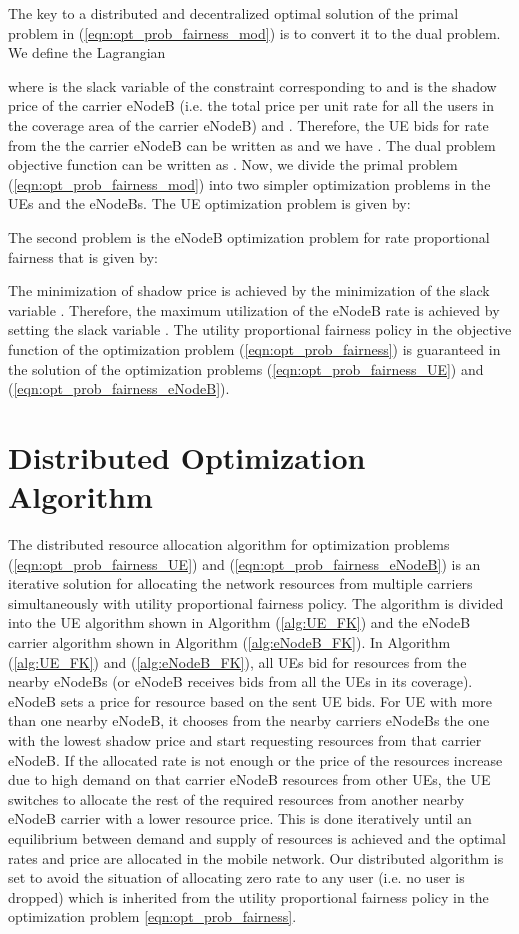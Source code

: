 \documentclass[conference]{IEEEtran}
\begin{document}
The key to a distributed and decentralized optimal solution of the primal problem in (\ref{eqn:opt_prob_fairness_mod}) is to convert it to the dual problem. We define the Lagrangian

where  is the  slack variable of the  constraint corresponding to  and  is the shadow price of the  carrier eNodeB (i.e. the total price per unit rate for all the users in the coverage area of the  carrier eNodeB) and . Therefore, the  UE bids for rate from the the  carrier eNodeB can be written as  and we have . The dual problem objective function can be written as . Now, we divide the primal problem (\ref{eqn:opt_prob_fairness_mod}) into two simpler optimization problems in the UEs and the eNodeBs. The  UE optimization problem is given by: 


The second problem is the  eNodeB optimization problem for rate proportional fairness that is given by: 

The minimization of shadow price  is achieved by the minimization of the slack variable . Therefore, the maximum utilization of the  eNodeB rate  is achieved by setting the slack variable . The utility proportional fairness policy in the objective function of the optimization problem (\ref{eqn:opt_prob_fairness}) is guaranteed in the solution of the optimization problems (\ref{eqn:opt_prob_fairness_UE}) and (\ref{eqn:opt_prob_fairness_eNodeB}).

\section{Distributed Optimization Algorithm}\label{sec:Algorithm}

The distributed resource allocation algorithm for optimization problems (\ref{eqn:opt_prob_fairness_UE}) and (\ref{eqn:opt_prob_fairness_eNodeB}) is an iterative solution for allocating the network resources from multiple carriers simultaneously with utility proportional fairness policy. The algorithm is divided into the  UE algorithm shown in Algorithm (\ref{alg:UE_FK}) and the  eNodeB carrier algorithm shown in Algorithm (\ref{alg:eNodeB_FK}). In Algorithm (\ref{alg:UE_FK}) and (\ref{alg:eNodeB_FK}), all UEs bid for resources from the nearby eNodeBs (or eNodeB receives bids from all the UEs in its coverage). eNodeB sets a price for resource based on the sent UE bids. For UE with more than one nearby eNodeB, it chooses from the nearby carriers eNodeBs the one with the lowest shadow price and start requesting resources from that carrier eNodeB. If the allocated rate is not enough or the price of the resources increase due to high demand on that carrier eNodeB resources from other UEs, the UE 
switches to allocate the rest of the required resources from another nearby eNodeB carrier with a lower resource price. This is done iteratively until an equilibrium between demand and supply of resources is achieved and the optimal rates and price are allocated in the mobile network. Our distributed algorithm is set to avoid the situation of allocating zero rate to any user (i.e. no user is dropped) which is inherited from the utility proportional fairness policy in the optimization problem \ref{eqn:opt_prob_fairness}. 
\end{document}
